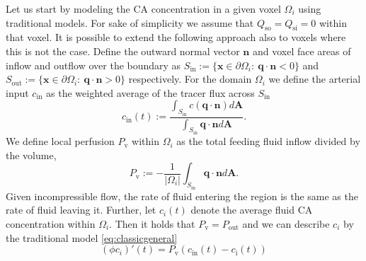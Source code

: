 \documentclass[10pt]{article}
\begin{document}
	Let us start by modeling the CA concentration in a given voxel $\Omega_i$ using traditional models.
	For sake of simplicity we assume that $Q_{\mathrm{so}} = Q_{\mathrm{si}} = 0$ within that voxel.
	It is possible to extend the following approach also to voxels where this is not the case.
	Define the outward normal vector $\mathbf{n}$ and voxel face areas of inflow and outflow over the boundary as $S_{\mathrm{in}} := \{ \mathbf{x} \in \partial \Omega_i: \ \mathbf{q} \cdot \mathbf{n} < 0 \}$ and $S_{\mathrm{out}}:= \{ \mathbf{x} \in \partial \Omega_i: \ \mathbf{q} \cdot \mathbf{n} > 0 \}$ respectively.
	For the domain $\Omega_i$ we define the arterial input $c_{\mathrm{in}}$ as the weighted average of the tracer flux across $S_{\mathrm{in}}$
	\begin{equation}\label{eq:cin}
	 	c_{\mathrm{in}}(t):= \frac{\int_{S_{\mathrm{in}}}c (\mathbf{q} \cdot \mathbf{n}) d \mathbf{A}}{\int_{S_{\mathrm{in}}} \mathbf{q} \cdot \mathbf{n} d \mathbf{A}}.
	\end{equation}
	We define local perfusion $P_{\mathrm{v}}$ within $\Omega_i$ as the total feeding fluid inflow divided by the volume,
	\begin{equation}\label{eq:perflocal}
		P_{\mathrm{v}} :=-\frac{1}{|\Omega_i|}\int_{S_{\mathrm{in}}} \mathbf{q} \cdot \mathbf{n} d \mathbf{A}.
	\end{equation}
	Given incompressible flow, the rate of fluid entering the region is the same as the rate of fluid leaving it. 
	Further, let $c_i(t)$ denote the average fluid CA concentration within $\Omega_i$.
	Then it holds that $P_{\mathrm{v}}=P_{\mathrm{out}}$ and we can describe $c_i$ by the traditional model \eqref{eq:classicgeneral}
	\begin{equation}\label{eq:singlevoxel}
		(\phi c_i)'(t)  = P_{\mathrm{v}} (c_\mathrm{in}(t)  - c_\mathrm{i}(t))
	\end{equation}
\end{document}
